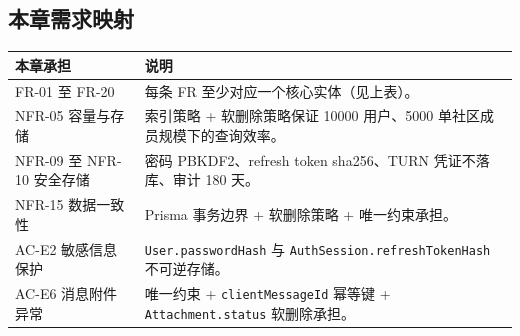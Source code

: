\subsection{本章需求映射}
\noindent\begin{tabularx}{\textwidth}{L{3cm}Y}
  \toprule
  本章承担 & 说明 \\
  \midrule
  FR-01 至 FR-20 & 每条 FR 至少对应一个核心实体（见上表）。 \\
  NFR-05 容量与存储 & 索引策略 + 软删除策略保证 10000 用户、5000 单社区成员规模下的查询效率。 \\
  NFR-09 至 NFR-10 安全存储 & 密码 PBKDF2、refresh token sha256、TURN 凭证不落库、审计 180 天。 \\
  NFR-15 数据一致性 & Prisma 事务边界 + 软删除策略 + 唯一约束承担。 \\
  AC-E2 敏感信息保护 & \texttt{User.passwordHash} 与 \texttt{AuthSession.refreshTokenHash} 不可逆存储。 \\
  AC-E6 消息附件异常 & 唯一约束 + \texttt{clientMessageId} 幂等键 + \texttt{Attachment.status} 软删除承担。 \\
  \bottomrule
\end{tabularx}
